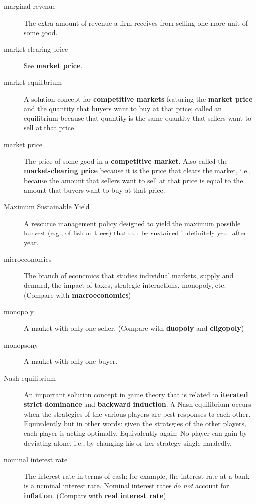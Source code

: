 \begin{description}
\item[marginal revenue] The extra amount of revenue a firm receives from selling one more unit of some good. 

\item[market-clearing price] See \textbf{market price}.

\item[market equilibrium] A solution concept for \textbf{competitive markets} featuring the \textbf{market price} and the quantity that buyers want to buy at that price; called an equilibrium because that quantity is the same quantity that sellers want to sell at that price.

\item[market price] The price of some good in a \textbf{competitive market}. Also called the \textbf{market-clearing price} because it is the price that clears the market, i.e., because the amount that sellers want to sell at that price is equal to the amount that buyers want to buy at that price.

\item[Maximum Sustainable Yield] A resource management policy designed to yield the maximum possible harvest (e.g., of fish or trees) that can be sustained indefinitely year after year.

\item[microeconomics] The branch of economics that studies individual markets, supply and demand, the impact of taxes, strategic interactions, monopoly, etc. (Compare with \textbf{macroeconomics})

\item[monopoly] A market with only one seller. (Compare with \textbf{duopoly} and \textbf{oligo\-poly})

\item[monopsony] A market with only one buyer. 

\item[Nash equilibrium] An important solution concept in game theory that is related to \textbf{iterated strict dominance} and \textbf{backward induction}. A Nash equilibrium occurs when the strategies of the various players are best responses to each other. Equivalently but in other words: given the strategies of the other players, each player is acting optimally. Equivalently again: No player can gain by deviating alone, i.e., by changing his or her strategy single-handedly.

\item[nominal interest rate] The interest rate in terms of cash; for example, the interest rate at a bank is a nominal interest rate. Nominal interest rates \emph{do not} account for \textbf{inflation}. (Compare with \textbf{real interest rate})


\end{description}
